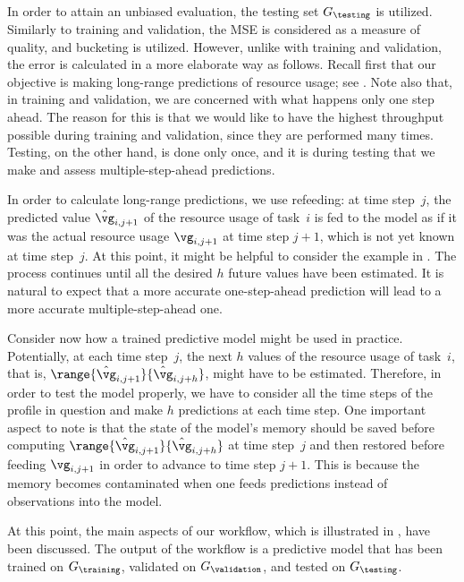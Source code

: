 In order to attain an unbiased evaluation, the testing set $G_\testing$ is
utilized. Similarly to training and validation, the \ac{MSE} is considered as a
measure of quality, and bucketing is utilized. However, unlike with training and
validation, the error is calculated in a more elaborate way as follows. Recall
first that our objective is making long-range predictions of resource usage; see
. Note also that, in training and validation, we are
concerned with what happens only one step ahead. The reason for this is that we
would like to have the highest throughput possible during training and
validation, since they are performed many times. Testing, on the other hand, is
done only once, and it is during testing that we make and assess
multiple-step-ahead predictions.

In order to calculate long-range predictions, we use refeeding: at time
step~$j$, the predicted value $\hat{\vg}_{i, j + 1}$ of the resource usage of
task~$i$ is fed to the model as if it was the actual resource usage $\vg_{i, j +
1}$ at time step $j + 1$, which is not yet known at time step~$j$. At this
point, it might be helpful to consider the example in .
The process continues until all the desired $h$ future values have been
estimated. It is natural to expect that a more accurate one-step-ahead
prediction will lead to a more accurate multiple-step-ahead one.

Consider now how a trained predictive model might be used in practice.
Potentially, at each time step~$j$, the next $h$ values of the resource usage of
task~$i$, that is, $\range{\hat{\vg}_{i, j + 1}}{\hat{\vg}_{i, j + h}}$, might
have to be estimated. Therefore, in order to test the model properly, we have to
consider all the time steps of the profile in question and make $h$ predictions
at each time step. One important aspect to note is that the state of the model's
memory should be saved before computing $\range{\hat{\vg}_{i, j +
1}}{\hat{\vg}_{i, j + h}}$ at time step~$j$ and then restored before feeding
$\vg_{i, j + 1}$ in order to advance to time step $j + 1$. This is because the
memory becomes contaminated when one feeds predictions instead of observations
into the model.

At this point, the main aspects of our workflow, which is illustrated in
, have been discussed. The output of the workflow is a
predictive model that has been trained on $G_\training$, validated on
$G_\validation$, and tested on $G_\testing$.
